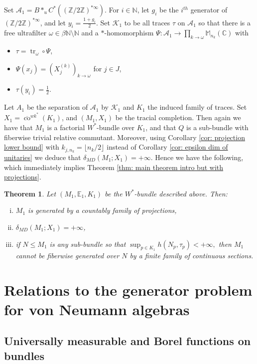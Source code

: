 \documentclass[10pt]{amsart}
\newtheorem{thm}{Theorem}[section]
\theoremstyle{definition}
\numberwithin{equation}{section}
\newcommand{\bC}{{\mathbb C}}
\newcommand{\bE}{{\mathbb E}}
\newcommand{\bM}{{\mathbb M}}
\newcommand{\bN}{{\mathbb N}}
\newcommand{\bZ}{{\mathbb Z}}
\newcommand{\cA}{{\mathcal A}}
\newcommand{\cK}{{\mathcal K}}
\DeclareMathOperator{\tr}{tr}
\DeclareMathOperator{\co}{co}
\begin{document}
Set $\cA_{1}=B*_{u}C^{*}((\bZ/2\bZ)^{*\infty})$. For $i\in \bN$, let $g_{i}$ be the $i^{th}$ generator of $(\bZ/2\bZ)^{*\infty}$, and let $y_{i}=\frac{1+g_{i}}{2}$. Set $\cK_{1}$ to be all traces $\tau$ on $\cA_{1}$ so that there is a free ultrafilter $\omega\in \beta\bN\setminus\bN$ and a $*$-homomorphism $\Psi\colon \cA_{1}\to \prod_{k\to\omega}\bM_{n_{k}}(\bC)$ with
\begin{itemize}
    \item $\tau=\tr_{\omega}\circ \Psi$, 
    \item $\Psi(x_{j})=(X_{j}^{(k)})_{k\to\omega}$ for $j\in J$,
    \item $\tau(y_{i})=\frac{1}{2}$.
\end{itemize}
Let $A_{1}$ be the separation of $\cA_{1}$ by $\cK_{1}$ and $K_{1}$ the induced family of traces. Set $X_{1}=\overline{\co}^{wk^{*}}(K_{1})$, and $(M_{1},X_{1})$ be the tracial completion. Then again we have that $M_{1}$ is a factorial $W^{*}$-bundle over $K_{1}$, and that $Q$ is a sub-bundle with fiberwise trivial relative commutant.
Moreover, using Corollary \ref{cor: projection lower bound} with $k_{j,n_{k}}=\lfloor{n_{k}/2\rfloor}$ instead of Corollary \ref{cor: epsilon dim of unitaries} we deduce that $\delta_{MD}(M_{1};X_{1})=+\infty$. Hence we have the following, which immediately implies Theorem \ref{thm: main theorem intro but with projections}.
\begin{thm}\label{thm: case of projections}
Let $(M_{1},\bE_{1},K_{1})$ be the $W^{*}$-bundle described above. Then:
\begin{enumerate}[(i)]
    \item $M_{1}$ is generated by a countably family of projections,
    \item $\delta_{MD}(M_{1};X_{1})=+\infty$,
    \item if $N\leq M_{1}$ is any sub-bundle so that $\sup_{p\in K_{1}}h(N_{p},\tau_{p})<+\infty,$ then $M_{1}$ cannot be fiberwise generated over $N$ by a finite family of continuous sections. 
\end{enumerate}

\end{thm}


\section{Relations to the generator problem for von Neumann algebras}



\subsection{Universally measurable and Borel functions on bundles}\label{Sec:universmally measurable bundle}
\end{document}
